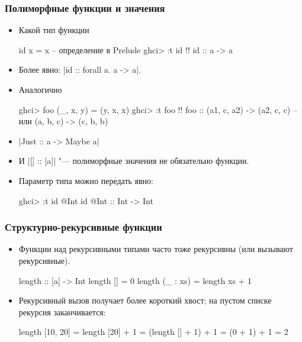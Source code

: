\documentclass[10pt]{beamer}
\begin{document}
\begin{frame}[fragile]
  \frametitle{Полиморфные функции и значения}
  \begin{itemize}
    \item Какой тип функции
          \begin{haskell}
            id x = x -- определение в Prelude
            ghci> :t id !\pause!
            id :: a -> a
          \end{haskell}
    \item Более явно: \haskinline|id :: forall a. a -> a|.
    \item Аналогично
          \begin{haskell}
            ghci> foo (_, x, y) = (y, x, x)
            ghci> :t foo !\pause!
            foo :: (a1, c, a2) -> (a2, c, c) 
            -- или (a, b, c) -> (c, b, b)
          \end{haskell}
    \item \haskinline|Just :: a -> Maybe a|
    \item И \haskinline|[] :: [a]| "--- полиморфные значения не обязательно функции.
    \item Параметр типа можно передать явно:
          \begin{haskell}
            ghci> :t id @Int
            id @Int :: Int -> Int
          \end{haskell}
  \end{itemize}
\end{frame}



\begin{frame}[fragile]
  \frametitle{Структурно-рекурсивные функции}
  \begin{itemize}
    \item Функции над рекурсивными типами часто тоже рекурсивны (или вызывают рекурсивные).
          \begin{haskell}
            length :: [a] -> Int
            length [] = 0
            length (_ : xs) = length xs + 1
          \end{haskell}
    \item Рекурсивный вызов получает более короткий хвост; на пустом списке рекурсия заканчивается:
          \begin{haskell}
            length [10, 20]
              = length [20] + 1
              = (length [] + 1) + 1
              = (0 + 1) + 1 = 2
          \end{haskell}
  \end{itemize}
\end{frame}
\end{document}
